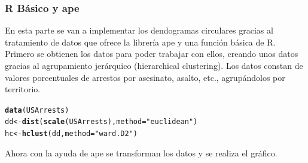 \documentclass{article}\usepackage[]{graphicx}\usepackage[]{color}
\makeatletter
\newcommand{\hlstr}[1]{\textcolor[rgb]{0.192,0.494,0.8}{#1}}%
\newcommand{\hlstd}[1]{\textcolor[rgb]{0.345,0.345,0.345}{#1}}%
\newcommand{\hlkwb}[1]{\textcolor[rgb]{0.69,0.353,0.396}{#1}}%
\newcommand{\hlkwc}[1]{\textcolor[rgb]{0.333,0.667,0.333}{#1}}%
\newcommand{\hlkwd}[1]{\textcolor[rgb]{0.737,0.353,0.396}{\textbf{#1}}}%
\newenvironment{kframe}{%
 \def\at@end@of@kframe{}%
 \ifinner\ifhmode%
  \def\at@end@of@kframe{\end{minipage}}%
  \begin{minipage}{\columnwidth}%
 \fi\fi%
 \def\FrameCommand##1{\hskip\@totalleftmargin \hskip-\fboxsep
 \colorbox{shadecolor}{##1}\hskip-\fboxsep
     \hskip-\linewidth \hskip-\@totalleftmargin \hskip\columnwidth}%
 \MakeFramed {\advance\hsize-\width
   \@totalleftmargin\z@ \linewidth\hsize
   \@setminipage}}%
 {\par\unskip\endMakeFramed%
 \at@end@of@kframe}
\newenvironment{knitrout}{}{} %
\makeatother
\begin{document}
\subsubsection{R B\'asico y ape}
En esta parte se van a implementar los dendogramas circulares gracias al tratamiento de datos que ofrece la librer\'ia ape y una funci\'on b\'asica de R.~\\
Primero se obtienen los datos para poder trabajar con ellos, creando unos datos gracias al agrupamiento jer\'arquico (hierarchical clustering). Los datos constan de valores porcentuales de arrestos por asesinato, asalto, etc., agrup\'andolos por territorio.
\begin{knitrout}
\color{fgcolor}\begin{kframe}
\begin{alltt}
\hlkwd{data}\hlstd{(USArrests)}
\hlstd{dd} \hlkwb{<-} \hlkwd{dist}\hlstd{(}\hlkwd{scale}\hlstd{(USArrests),} \hlkwc{method} \hlstd{=} \hlstr{"euclidean"}\hlstd{)}
\hlstd{hc} \hlkwb{<-} \hlkwd{hclust}\hlstd{(dd,} \hlkwc{method} \hlstd{=} \hlstr{"ward.D2"}\hlstd{)}
\end{alltt}
\end{kframe}
\end{knitrout}
Ahora con la ayuda de ape \cite{docu_ape}
se transforman los datos y se realiza el gr\'afico.
\end{document}
